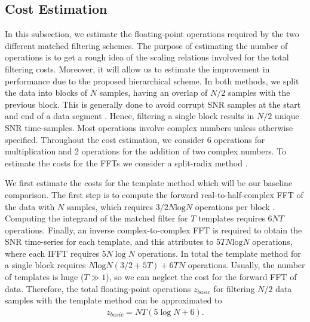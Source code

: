 \subsection{Cost Estimation}\label{Sec:Cost-estimation}
In this subsection, we estimate the floating-point operations required by the two different matched filtering schemes. The purpose of estimating the number of operations is to get a rough idea of the scaling relations involved for the total filtering costs. Moreover, it will allow us to estimate the improvement in performance due to the proposed hierarchical scheme. In both methods, we split the data into blocks of $N$ samples, having an overlap of $N/2$ samples with the previous block. This is generally done to avoid corrupt SNR samples at the start and end of a data segment \cite{find_chirp}. Hence, filtering a single block results in $N/2$ unique SNR time-samples. Most operations involve complex numbers unless otherwise specified. Throughout the cost estimation, we consider 6 operations for multiplication and 2 operations for the addition of two complex numbers. To estimate the costs for the FFTs we consider a split-radix method \cite{FFT-op}.

We first estimate the costs for the template method which will be our baseline comparison. The first step is to compute the forward real-to-half-complex FFT of the data with $N$ samples, which requires $3/2N\text{log}N$ operations per block \cite{FFT-op}. Computing the integrand of the matched filter for $T$ templates requires $6NT$ operations. Finally, an inverse complex-to-complex FFT is required to obtain the SNR time-series for each template, and this attributes to $5TN\text{log}N$ operations, where each IFFT requires $5N\log N$ operations. In total the template method for a single block requires $N\text{log}N(3/2+5T) + 6TN$ operations. Usually, the number of templates is huge ($T \gg 1$), so we can neglect the cost for the forward FFT of data. Therefore, the total floating-point operations $z_{basic}$ for filtering $N/2$ data samples with the template method can be approximated to
\begin{align}
\label{FFT_operations}
     z_{basic} = NT(5\log N + 6).
\end{align}

